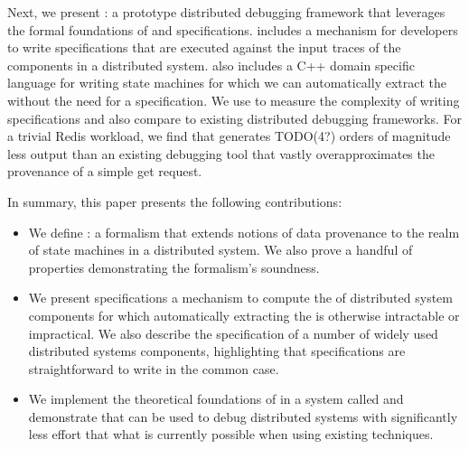 Next, we present \fluent{}: a prototype distributed debugging framework that
leverages the formal foundations of \watprovenance{} and \watprovenance{}
specifications. \fluent{} includes a mechanism for developers to write
\watprovenance{} specifications that are executed against the input traces of
the components in a distributed system. \fluent{} also includes a C++ domain
specific language for writing state machines for which we can automatically
extract the \watprovenance{} without the need for a \watprovenance{}
specification. We use \fluent{} to measure the complexity of writing
\watprovenance{} specifications and also compare \fluent{} to existing
distributed debugging frameworks. For a trivial Redis workload, we find that
\fluent{} generates TODO(4?) orders of magnitude less output than an existing
debugging tool that vastly overapproximates the provenance of a simple get
request.

In summary, this paper presents the following contributions:
\begin{itemize}
  \item
    We define \watprovenance{}: a formalism that extends notions of data
    provenance to the realm of state machines in a distributed system. We also
    prove a handful of properties demonstrating the formalism's soundness.
  \item
    We present \watprovenance{} specifications a mechanism to compute the
    \watprovenance{} of distributed system components for which automatically
    extracting the \watprovenance{} is otherwise intractable or impractical. We
    also describe the \watprovenance{} specification of a number of widely used
    distributed systems components, highlighting that \watprovenance{}
    specifications are straightforward to write in the common case.
  \item
    We implement the theoretical foundations of \watprovenance{} in a system
    called \fluent{} and demonstrate that \fluent{} can be used to debug
    distributed systems with significantly less effort that what is currently
    possible when using existing techniques.
\end{itemize}
